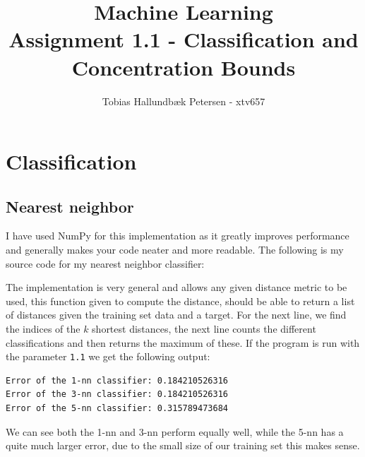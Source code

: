 \documentclass[a4paper]{article}
\title{Machine Learning\\Assignment 1.1 - Classification and Concentration Bounds}
\author{Tobias Hallundbæk Petersen - xtv657}
\begin{document}
\maketitle
\section{Classification}
\subsection{Nearest neighbor}
I have used NumPy for this implementation as it greatly improves performance and generally makes your code neater and more readable. The following is my source code for my nearest neighbor classifier:

The implementation is very general and allows any given distance metric to be used, this function given to compute the distance, should be able to return a list of distances given the training set data and a target. For the next line, we find the indices of the $k$ shortest distances, the next line counts the different classifications and then returns the maximum of these.
If the program is run with the parameter \texttt{1.1} we get the following output:
\begin{lstlisting}
Error of the 1-nn classifier: 0.184210526316
Error of the 3-nn classifier: 0.184210526316
Error of the 5-nn classifier: 0.315789473684
\end{lstlisting}
We can see both the 1-nn and 3-nn perform equally well, while the 5-nn has a quite much larger error, due to the small size of our training set this makes sense.
\end{document}
